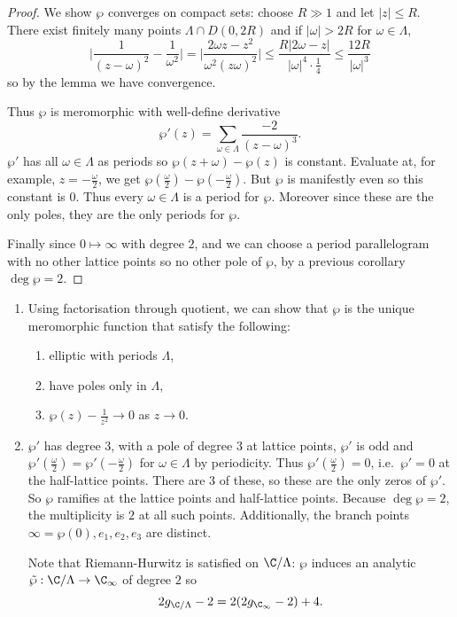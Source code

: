 \documentclass[a4paper]{article}
\begin{document}
\begin{proof}
  We show \(\wp\) converges on compact sets: choose \(R \gg 1\) and let \(|z| \leq R\). There exist finitely many points \(\Lambda \cap D(0, 2R)\) and if \(|\omega| > 2R\) for \(\omega \in \Lambda\),
  \[
    \Bigg| \frac{1}{(z - \omega)^2} - \frac{1}{\omega^2} \Bigg|
    = \Bigg| \frac{2\omega z - z^2}{\omega^2(z  \omega)^2} \Bigg|
    \leq \frac{R |2\omega - z|}{|\omega|^4 \cdot \frac{1}{4}}
    \leq \frac{12R}{|\omega|^3}
  \]
  so by the lemma we have convergence.

  Thus \(\wp\) is meromorphic with well-define derivative
  \[
    \wp'(z) = \sum_{\omega \in \Lambda} \frac{-2}{(z - \omega)^3}.
  \]
  \(\wp'\) has all \(\omega \in \Lambda\) as periods so \(\wp(z + \omega) - \wp(z)\) is constant. Evaluate at, for example, \(z = - \frac{\omega}{2}\), we get \(\wp(\frac{\omega}{2}) - \wp(-\frac{\omega}{2})\). But \(\wp\) is manifestly even so this constant is \(0\). Thus every \(\omega \in \Lambda\) is a period for \(\wp\). Moreover since these are the only poles, they are the only periods for \(\wp\).

  Finally since \(0 \mapsto \infty\) with degree \(2\), and we can choose a period parallelogram with no other lattice points so no other pole of \(\wp\), by a previous corollary \(\deg \wp = 2\).
\end{proof}

\begin{remark}\leavevmode
  \begin{enumerate}
  \item Using factorisation through quotient, we can show that \(\wp\) is the unique meromorphic function that satisfy the following:
    \begin{enumerate}
    \item elliptic with periods \(\Lambda\),
    \item have poles only in \(\Lambda\),
    \item \(\wp(z) - \frac{1}{z^2} \to 0\) as \(z \to 0\).
    \end{enumerate}
  \item \(\wp'\) has degree \(3\), with a pole of degree \(3\) at lattice points, \(\wp'\) is odd and \(\wp'(\frac{\omega}{2}) = \wp'(-\frac{\omega}{2})\) for \(\omega \in \Lambda\) by periodicity. Thus \(\wp'(\frac{\omega}{2}) = 0\), i.e.\ \(\wp' = 0\) at the half-lattice points. There are 3 of these, so these are the only zeros of \(\wp'\). So \(\wp\) ramifies at the lattice points and half-lattice points. Because \(\deg \wp = 2\), the multiplicity is \(2\) at all such points. Additionally, the branch points \(\infty = \wp(0), e_1, e_2, e_3\) are distinct.

    Note that Riemann-Hurwitz is satisfied on \(\C/\Lambda\): \(\wp\) induces an analytic \(\tilde \wp: \C/\Lambda \to \C_\infty\) of degree \(2\) so
    \[
      2g_{\C/\Lambda} - 2 = 2(2 g_{\C_\infty} - 2) + 4.
    \]
  \end{enumerate}
\end{remark}
\end{document}
